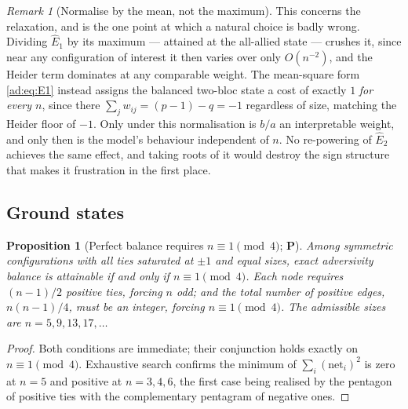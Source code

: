 \documentclass[11pt]{article}
\numberwithin{equation}{section}
\theoremstyle{plain}
\newtheorem{proposition}[theorem]{Proposition}
\theoremstyle{definition}
\theoremstyle{remark}
\newtheorem{remark}[theorem]{Remark}
\begin{document}
\begin{remark}[Normalise by the mean, not the maximum]
\label{ad:rem:normalisation}
This concerns the relaxation, and is the one point at which a natural
choice is badly wrong. Dividing $\hat E_1$ by its maximum --- attained
at the all-allied state ---
crushes it, since near any configuration of interest it then varies over
only $O(n^{-2})$, and the Heider term dominates at any comparable
weight. The mean-square form \eqref{ad:eq:E1} instead assigns the
balanced two-bloc state a cost of exactly $1$ \emph{for every $n$},
since there $\sum_j w_{ij}=(p-1)-q=-1$ regardless of size, matching the
Heider floor of $-1$. Only under this normalisation is $b/a$ an
interpretable weight, and only then is the model's behaviour independent
of $n$. No re-powering of $\hat E_2$ achieves the same effect, and
taking roots of it would destroy the sign structure that makes it
frustration in the first place.
\end{remark}

\subsection{Ground states}\label{ad:sub:ground}

\begin{proposition}[Perfect balance requires $n\equiv1\pmod4$;
\textbf{P}]\label{ad:prop:congruence}
Among symmetric configurations with all ties saturated at $\pm1$ and
equal sizes, exact adversivity balance is attainable if and only if
$n\equiv1\pmod4$. Each node requires $(n-1)/2$ positive ties, forcing
$n$ odd; and the total number of positive edges, $n(n-1)/4$, must be an
integer, forcing $n\equiv1\pmod4$. The admissible sizes are
$n=5,9,13,17,\dots$
\end{proposition}

\begin{proof}
Both conditions are immediate; their conjunction holds exactly on
$n\equiv1\pmod4$. Exhaustive search confirms the minimum of
$\sum_i(\text{net}_i)^2$ is zero at $n=5$ and positive at
$n=3,4,6$, the first case being realised by the pentagon of positive
ties with the complementary pentagram of negative ones.
\end{proof}
\end{document}
